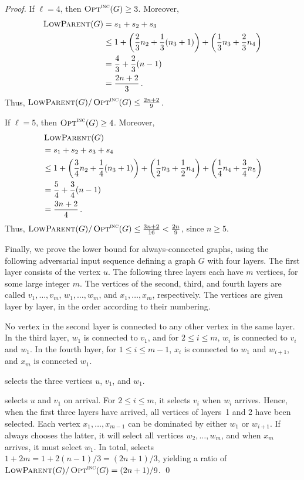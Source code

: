 \begin{proof}
If $\ell=4$, then $\operatorname{\textsc{Opt}}^\textsc{\ensuremath{\text{inc}}}(G) \geq 3$.
Moreover,
\begin{align*}
\operatorname{\textsc{LowParent}}(G) 
&  = s_1+s_2+s_3 \\
&  \leq 1 + \left( \frac23 n_2 + \frac13(n_3+1) \right) + 
       \left( \frac13 n_3 + \frac23 n_4 \right) \\
&  = \frac43 + \frac23 (n-1)\\
&  = \frac{2n+2}{3} \,.
\end{align*}
Thus, $\operatorname{\textsc{LowParent}}(G) / \operatorname{\textsc{Opt}}^\textsc{\ensuremath{\text{inc}}}(G) \leq \frac{2n+2}{9}$.

If $\ell=5$, then $\operatorname{\textsc{Opt}}^\textsc{\ensuremath{\text{inc}}}(G) \geq 4$.
Moreover,
\begin{align*}
&  \operatorname{\textsc{LowParent}}(G) \\
&  = s_1+s_2+s_3+s_4 \\
&  \leq 1 + \left( \frac34 n_2 + \frac14(n_3+1) \right) + 
       \left( \frac12 n_3 + \frac12 n_4 \right) +
       \left( \frac14 n_4 + \frac34 n_5 \right) \\
&  = \frac54 + \frac34 (n-1)\\
&  = \frac{3n+2}{4} \,.
\end{align*}
Thus, $\operatorname{\textsc{LowParent}}(G) / \operatorname{\textsc{Opt}}^\textsc{\ensuremath{\text{inc}}}(G) \leq \frac{3n+2}{16} <
\frac{2n}{9}$, since $n \geq 5$.

Finally, we prove the lower bound for always-connected graphs, using
the following adversarial input sequence defining a graph $G$ with four
layers.
The first layer consists of the vertex $u$.
The following three layers each have $m$ vertices, for some large
integer $m$.
The vertices of the second, third, and fourth layers are called
$v_1,\ldots,v_m$, $w_1,\ldots,w_m$, and $x_1,\ldots,x_m$, respectively.
The vertices are given layer by layer, in the order according to their
numbering.

No vertex in the second layer is connected to any other vertex in the
same layer.
In the third layer, $w_1$ is connected to $v_1$, and for $2 \leq i
\leq m$, $w_i$ is connected to $v_i$ and $w_1$.
In the fourth layer, for $1 \leq i \leq m-1$, $x_i$ is connected to
$w_1$ and $w_{i+1}$, and $x_m$ is connected $w_1$.

\onopt selects the three vertices $u$, $v_1$, and $w_1$.

\alayersparent selects $u$ and $v_1$ on arrival.
For $2 \leq i \leq m$, it selects $v_i$ when $w_i$ arrives.
Hence, when the first three layers have arrived, all vertices of
layers~1 and 2 have been selected.
Each vertex $x_1, \ldots, x_{m-1}$ can be dominated by either $w_1$ or
$w_{i+1}$.
If \alayersparent always chooses the latter, it will select all
vertices $w_2,\ldots,w_{m}$, and when $x_m$ arrives, it must select
$w_1$.
In total, \alayersparent selects $1+2m = 1 + 2(n-1)/3 = (2n+1)/3$,
yielding a ratio of $\operatorname{\textsc{LowParent}}(G)/\operatorname{\textsc{Opt}}^\textsc{\ensuremath{\text{inc}}}(G) = (2n+1)/9$. 
\qed\end{proof}

